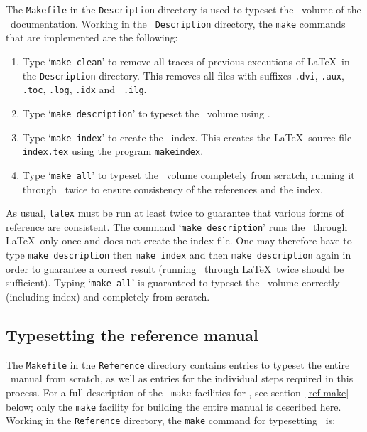 The {\tt Makefile} in the {\tt Description} directory is used to typeset the
\DESCRIPTION\ volume of the \HOL\ documentation.  Working in the {\tt
Description} directory, the {\tt make} commands that are implemented are the
following:

\begin{enumerate}

\item Type `{\tt make clean}' to remove all traces of previous executions of
\LaTeX\ in the {\tt Description} directory.  This removes all files with
suffixes {\tt .dvi}, {\tt .aux}, {\tt .toc}, {\tt .log}, {\tt .idx} and {\tt
.ilg}.

\item Type `{\tt make description}' to typeset the \DESCRIPTION\ volume using
\latex.

\item Type `{\tt make index}' to create the \DESCRIPTION\ index.  This creates
the \LaTeX\ source file {\tt index.tex} using the program {\tt makeindex}.

\item Type `{\tt make all}' to typeset the \DESCRIPTION\ volume completely from
scratch, running it through \latex\ twice to ensure consistency of the
references and the index.

\end{enumerate}

\noindent As usual, {\tt latex} must be run at least twice to guarantee that
various forms of reference are consistent.  The command `{\tt make
description}' runs the \DESCRIPTION\ through \LaTeX\ only once and does not
create the index file.  One may therefore have to type {\tt make description}
then {\tt make index} and then {\tt make description} again in order to
guarantee a correct result (running \DESCRIPTION\ through \LaTeX\ twice should
be sufficient).  Typing `{\tt make all}' is guaranteed to typeset the
\DESCRIPTION\ volume correctly (including index) and completely from scratch.


\subsection{Typesetting the reference manual}\label{ref-make-all}

The {\tt Makefile} in the {\tt Reference} directory contains entries to typeset
the entire \REFERENCE\ manual from scratch, as well as entries for the
individual steps required in this process.  For a full description of the {\tt
make} facilities for \REFERENCE, see section~\ref{ref-make} below; only the
{\tt make} facility for building the entire manual is described here.  Working
in the {\tt Reference} directory, the {\tt make} command for typesetting
\REFERENCE\ is:

